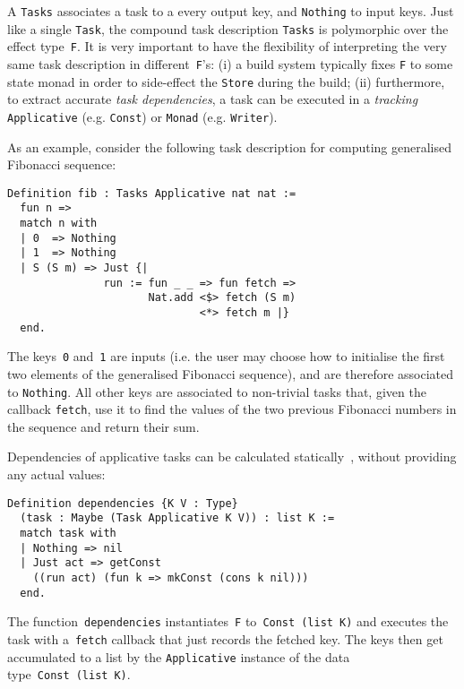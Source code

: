 \documentclass[sigplan]{acmart}\settopmatter{printfolios=true,printccs=false,printacmref=false}
\newcommand{\hs}{\texttt}
\newcommand{\coq}{\texttt}
\begin{document}
A \hs{Tasks} associates a task to a every output key, and \hs{Nothing} to input
keys. Just like a single \hs{Task}, the compound task description \hs{Tasks} is
polymorphic over the effect type~\hs{F}. It is very important to have the
flexibility of interpreting the very same task description in
different~\hs{F}'s: (i) a build system typically fixes \hs{F} to some state
monad in order to side-effect the \hs{Store} during the build; (ii) furthermore,
to extract accurate \emph{task dependencies}, a task can be executed in a
\emph{tracking} \hs{Applicative} (e.g. \hs{Const}) or \hs{Monad}
(e.g. \hs{Writer}).

As an example, consider the following task description for computing generalised
Fibonacci sequence:

\vspace{-1mm}
\begin{verbatim}
Definition fib : Tasks Applicative nat nat :=
  fun n =>
  match n with
  | 0  => Nothing
  | 1  => Nothing
  | S (S m) => Just {|
               run := fun _ _ => fun fetch =>
                      Nat.add <$> fetch (S m)
                              <*> fetch m |}
  end.
\end{verbatim}
\vspace{-1mm}

\noindent
The keys~\coq{0} and~\coq{1} are inputs (i.e. the user may choose
how to initialise the first two elements of the generalised Fibonacci sequence),
and are therefore associated to \hs{Nothing}. All other keys are associated to
non-trivial tasks that, given the callback \hs{fetch}, use it to find the values
of the two previous Fibonacci numbers in the sequence and return their sum.

\noindent
Dependencies of applicative tasks can be calculated
statically~\cite{free-applicatives}, without providing any actual values:

\vspace{-1mm}
\begin{verbatim}
Definition dependencies {K V : Type}
  (task : Maybe (Task Applicative K V)) : list K :=
  match task with
  | Nothing => nil
  | Just act => getConst
    ((run act) (fun k => mkConst (cons k nil)))
  end.
\end{verbatim}
\vspace{-1mm}

\noindent
The function~\hs{dependencies} instantiates~\hs{F}
to~\hs{Const}~\hs{(}\hs{list}~\hs{K)} and executes the task with a~\hs{fetch}
callback that just records the fetched key. The keys then get accumulated to a
list by the \hs{Applicative} instance of the data
type~\hs{Const}~\hs{(}\hs{list}~\hs{K)}.
\end{document}
